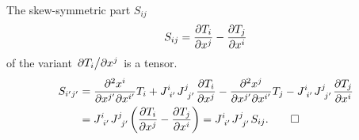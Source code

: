 \documentclass{article}
\begin{document}
	\begin{proposition}
		The skew-symmetric part $ S_{ij} $
		\[
		S_{ij} = \pdv{T_{i}}{x^{j}} - \pdv{T_{j}}{x^{i}}
		\]
		of the variant $ \pdv*{T_{i}}{x^{j}} $ is a tensor.
		\begin{align*}
		S_{i^\prime j^\prime} &= \pdv{^2 x^{i}}{x^{j^\prime} \partial x^{i^\prime}} T_{i} + J\indices{^{i}_{i^\prime}} J\indices{^{j}_{j^\prime}} \pdv{T_{i}}{x^{j}} - \pdv{^2 x^{j}}{x^{j^\prime} \partial x^{i^\prime}} T_{j} - J\indices{^{i}_{i^\prime} }J\indices{^{j}_{j^\prime}} \pdv{T_{j}}{x^{i}} \\
		&= J\indices{^{i}_{i^\prime}} J\indices{^{j}_{j^\prime}} \qty(\pdv{T_{i}}{x^{j}} - \pdv{T_{j}}{x^{i}}) 
		= J\indices{^{i}_{i^\prime}} J\indices{^{j}_{j^\prime}} S_{ij}. \qed
		\end{align*}
	\end{proposition}
\end{document}
